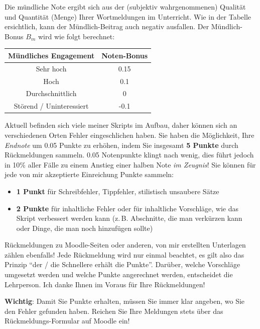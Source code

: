 \begin{textBox}[title=\emoji{person-raising-hand} Bonus 1: Wortmeldungen im Unterricht]

	Die mündliche Note ergibt sich aus der (subjektiv wahrgenommenen) Qualität und Quantität (Menge) Ihrer Wortmeldungen im Unterricht. Wie in der Tabelle ersichtlich, kann der Mündlich-Beitrag auch negativ ausfallen. Der Mündlich-Bonus $B_m$ wird wie folgt berechnet:

	\begin{table}[H]
		\centering
		\begin{tabular}{c|c}
			\textbf{Mündliches Engagement} & \textbf{Noten-Bonus} \\\midrule\midrule
			Sehr hoch                      & 0.15                 \\\midrule
			Hoch                           & 0.1                  \\\midrule
			Durchschnittlich               & 0                    \\\midrule
			Störend / Uninteressiert       & -0.1                    \\
		\end{tabular}
	\end{table}
	
\end{textBox}

\begin{textBox}[title=\emoji{speech-balloon} Bonus 2: Rückmeldungen zu den Skripts und Unterlagen, colback=FDUblue!8, colframe=FDUblue, colbacktitle=FDUblue]
	Aktuell befinden sich viele meiner Skripts im Aufbau, daher können sich an verschiedenen Orten Fehler eingeschlichen haben. Sie haben die Möglichkeit, Ihre \textit{Endnote} um 0.05 Punkte zu erhöhen, indem Sie insgesamt \textbf{5 Punkte} durch Rückmeldungen sammeln. 0.05 Notenpunkte klingt nach wenig, dies führt jedoch in 10\% aller Fälle zu einem Anstieg einer halben Note \textit{im Zeugnis}! Sie können für jede von mir akzeptierte Einreichung Punkte sammeln:
	\begin{itemize}
		\item \textbf{1 Punkt} für Schreibfehler, Tippfehler, stilistisch unsaubere Sätze
		\item \textbf{2 Punkte} für inhaltliche Fehler oder für inhaltliche Vorschläge, wie das Skript verbessert werden kann (z.\,B. Abschnitte, die man verkürzen kann oder Dinge, die man noch hinzufügen sollte)
	\end{itemize}

	Rückmeldungen zu Moodle-Seiten oder anderen, von mir erstellten Unterlagen zählen ebenfalls! Jede Rückmeldung wird nur einmal beachtet, es gilt also das Prinzip \enquote{der / die Schnellere erhält die Punkte}. Darüber, welche Vorschläge umgesetzt werden und welche Punkte angerechnet werden, entscheidet die Lehrperson. Ich danke Ihnen im Voraus für Ihre Rückmeldungen!
	
	\textbf{Wichtig}: Damit Sie Punkte erhalten, müssen Sie immer klar angeben, wo Sie den Fehler gefunden haben. Reichen Sie Ihre Meldungen stets über das Rückmeldungs-Formular auf Moodle ein!
\end{textBox}


